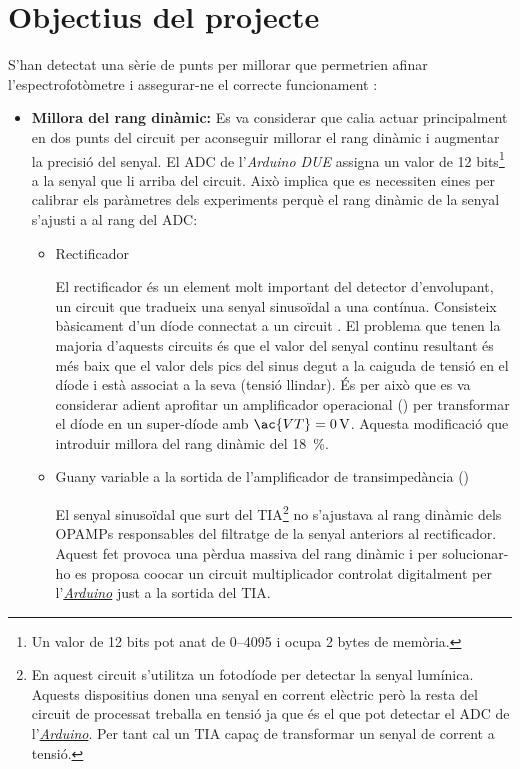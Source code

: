 \section{Objectius del projecte}\label{sec:objectius_del_projecte}

S'han detectat una sèrie de punts per millorar que permetrien afinar l'espectrofotòmetre i assegurar-ne el correcte funcionament \cite{carles:2017}:

\begin{itemize}
	\item{\textbf{Millora del rang dinàmic: }}Es va considerar que calia actuar principalment en dos punts del circuit per aconseguir millorar el rang dinàmic i augmentar la precisió del senyal. El \ac{ADC} de l'\textit{Arduino DUE} assigna un valor de \num{12} bits\footnote{Un valor de \num{12} bits pot anat de \numrange[range-phrase = \ a\ ]{0}{4095} i ocupa \num{2} bytes de memòria.} a la senyal que li arriba del circuit. Això implica que es necessiten eines per calibrar els paràmetres dels experiments perquè el rang dinàmic de la senyal s'ajusti a al rang del \ac{ADC}:
	
	\begin{itemize}
		
		\item{Rectificador}
		
		El rectificador és un element molt important del detector d'envolupant, un circuit que tradueix una senyal sinusoïdal a una contínua. Consisteix bàsicament d'un díode connectat a un circuit . El problema que tenen la majoria d'aquests circuits és que el valor del senyal continu resultant és més baix que el valor dels pics del sinus degut a la caiguda de tensió en el díode i està associat a la seva  (tensió llindar). És per això que es va considerar adient aprofitar un amplificador operacional () per transformar el díode en un super-díode amb $ \ac{VT} = \SI{0}{\volt} $. Aquesta modificació que introduir millora del rang dinàmic del \SI{18}{\percent}.
		
		\item{Guany variable a la sortida de l'amplificador de transimpedància ()}
		
		El senyal sinusoïdal que surt del \ac{TIA}\footnote{En aquest circuit s'utilitza un fotodíode per detectar la senyal lumínica. Aquests dispositius donen una senyal en corrent elèctric però la resta del circuit de processat treballa en tensió ja que és el que pot detectar el \ac{ADC} de l'\hyperref[subsec:arduino]{\textit{Arduino}}. Per tant cal un \ac{TIA} capaç de transformar un senyal de corrent a tensió.} no s'ajustava al rang dinàmic dels \ac{OPAMP}s responsables del filtratge de la senyal anteriors al rectificador. Aquest fet provoca una pèrdua massiva del rang dinàmic i per solucionar-ho es proposa co\lgem ocar un circuit multiplicador controlat digitalment per l'\hyperref[subsec:arduino]{\textit{Arduino}} just a la sortida del \ac{TIA}.
		

\end{itemize}
\end{itemize}
